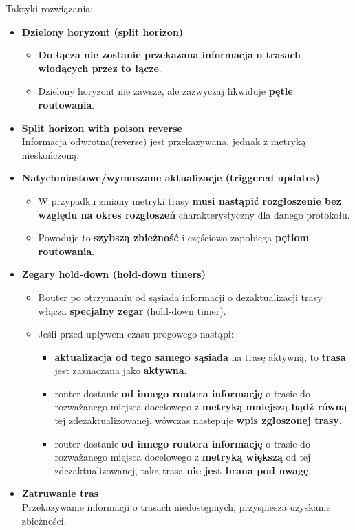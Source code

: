 \documentclass[../main.tex]{subfiles}
\begin{document}
    Taktyki rozwiązania:
    \begin{itemize}
        \item \textbf{Dzielony horyzont (split horizon)}
        \begin{itemize}
            \item \textbf{Do łącza nie zostanie przekazana informacja o trasach wiodących przez to łącze}.
            \item Dzielony horyzont nie zawsze, ale zazwyczaj likwiduje \textbf{pętle routowania}.
        \end{itemize}

        \item \textbf{Split horizon with poison reverse}\\
        Informacja odwrotna(reverse) jest przekazywana, jednak z metryką nieskończoną.

        \item \textbf{Natychmiastowe/wymuszane aktualizacje (triggered updates)}
        \begin{itemize}
            \item W przypadku zmiany metryki trasy \textbf{musi nastąpić rozgłoszenie bez względu na okres
            rozgłoszeń} charakterystyczny dla danego protokołu.
            \item Powoduje to \textbf{szybszą zbieżność} i częściowo zapobiega \textbf{pętlom routowania}.
        \end{itemize}

        \item \textbf{Zegary hold-down (hold-down timers)}
        \begin{itemize}
            \item Router po otrzymaniu od sąsiada informacji o dezaktualizacji trasy włącza \textbf{specjalny zegar} (hold-down timer).
            \item Jeśli przed upływem czasu progowego nastąpi:
            \begin{itemize}
                \item \textbf{aktualizacja od tego samego sąsiada} na trasę aktywną, to \textbf{trasa} jest zaznaczana jako \textbf{aktywna}.
                \item router dostanie \textbf{od innego routera informację} o trasie do rozważanego miejsca docelowego z \textbf{metryką mniejszą bądź równą} tej zdezaktualizowanej, wówczas następuje \textbf{wpis zgłoszonej trasy}.
                \item router dostanie \textbf{od innego routera informację} o trasie do rozważanego miejsca docelowego z \textbf{metryką większą} od tej zdezaktualizowanej, taka trasa \textbf{nie jest brana pod uwagę}.
            \end{itemize}
        \end{itemize}

        \item \textbf{Zatruwanie tras}\\
        Przekazywanie informacji o trasach niedostępnych, przyspiesza uzyskanie zbieżności.
    \end{itemize}
\end{document}
